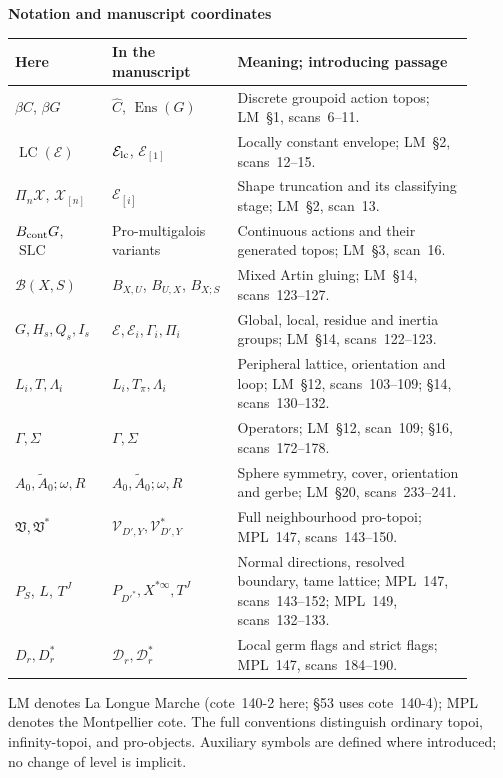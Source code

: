 \begin{center}
\small\textbf{Notation and manuscript coordinates}
\end{center}
\begingroup\footnotesize
\begin{tabular}{p{0.19\linewidth}p{0.25\linewidth}p{0.47\linewidth}}
\toprule
Here & In the manuscript & Meaning; introducing passage\\
\midrule
$\beta C$, $\beta G$ & $\widehat C$, $\operatorname{Ens}(G)$ & Discrete groupoid action topos; LM~\S1, scans~6--11.\\
$\operatorname{LC}(\mathcal E)$ & $\mathcal E_{\rm lc}$, $\mathcal E_{[1]}$ & Locally constant envelope; LM~\S2, scans~12--15.\\
$\Pi_n\mathcal X$, $\mathcal X_{[n]}$ & $\mathcal E_{[i]}$ & Shape truncation and its classifying stage; LM~\S2, scan~13.\\
$B_{\rm cont}G$, $\operatorname{SLC}$ & Pro-multigalois variants & Continuous actions and their generated topos; LM~\S3, scan~16.\\
$\mathcal B(X,S)$ & $B_{X,U}$, $B_{U,X}$, $B_{X;S}$ & Mixed Artin gluing; LM~\S14, scans~123--127.\\
$G,H_s,Q_s,I_s$ & $\mathcal E,\mathcal E_i,\Gamma_i,\Pi_i$ & Global, local, residue and inertia groups; LM~\S14, scans~122--123.\\
$L_i,T,\Lambda_i$ & $L_i,T_\pi,\Lambda_i$ & Peripheral lattice, orientation and loop; LM~\S12, scans~103--109; \S14, scans~130--132.\\
$\Gamma,\Sigma$ & $\Gamma,\Sigma$ & Operators; LM~\S12, scan~109; \S16, scans~172--178.\\
$A_0,\widetilde A_0;\omega,R$ & $A_0,\widetilde A_0;\omega,R$ & Sphere symmetry, cover, orientation and gerbe; LM~\S20, scans~233--241.\\
$\mathfrak V,\mathfrak V^*$ & $\mathcal V_{D',Y},\mathcal V^*_{D',Y}$ & Full neighbourhood pro-topoi; MPL~147, scans~143--150.\\
$P_S$, $L$, $T^J$ & $P_{D'^*},X^{*\infty},T^J$ & Normal directions, resolved boundary, tame lattice; MPL~147, scans~143--152; MPL~149, scans~132--133.\\
$D_r,D_r^*$ & $\mathcal D_r,\mathcal D_r^*$ & Local germ flags and strict flags; MPL~147, scans~184--190.\\
\bottomrule
\end{tabular}
\endgroup

\smallskip
\noindent\footnotesize
LM denotes La Longue Marche (cote~140-2 here; \S53 uses cote~140-4); MPL denotes the Montpellier cote.
The full conventions distinguish ordinary topoi, infinity-topoi, and pro-objects.
Auxiliary symbols are defined where introduced; no change of level is implicit.
\normalsize
